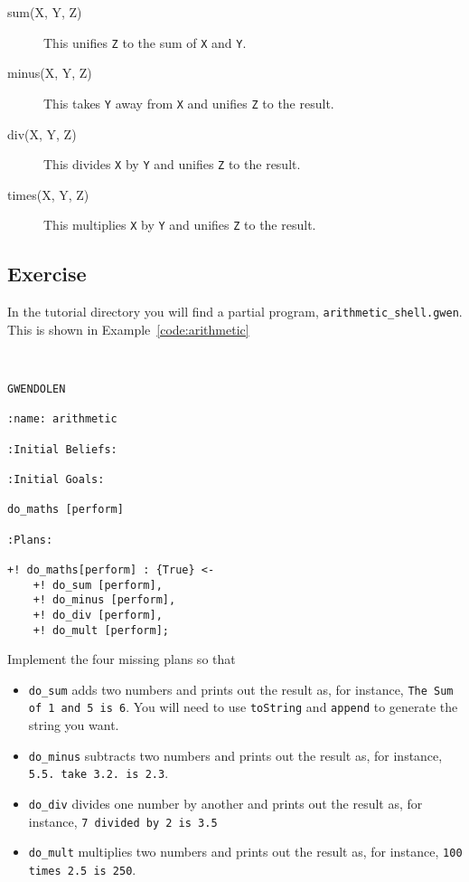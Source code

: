 \begin{description}
\item[sum(X, Y, Z)] This unifies \lstinline{Z} to the sum of \lstinline{X} and \lstinline{Y}.
\item[minus(X, Y, Z)] This takes \lstinline{Y} away from \lstinline{X} and unifies \lstinline{Z} to the result.
\item[div(X, Y, Z)] This divides \lstinline{X} by \lstinline{Y} and unifies \lstinline{Z} to the result.
\item[times(X, Y, Z)] This multiplies \lstinline{X} by \lstinline{Y} and unifies \lstinline{Z} to the result.
\end{description}

\subsection{Exercise}
\begin{sloppypar}
In the tutorial directory you will find a partial program, \texttt{arithmetic\_shell.gwen}.  This is shown in Example~\ref{code:arithmetic}
\end{sloppypar}

\begin{ourexample}
\label{code:arithmetic} \quad \\
\begin{lstlisting}[basicstyle=\sffamily,style=easslisting,language=Gwendolen]
GWENDOLEN

:name: arithmetic

:Initial Beliefs:

:Initial Goals:

do_maths [perform]

:Plans:
	
+! do_maths[perform] : {True} <-
	+! do_sum [perform],
	+! do_minus [perform],
	+! do_div [perform],
	+! do_mult [perform];
\end{lstlisting}
\end{ourexample}

Implement the four missing plans so that
\begin{itemize}
\item \lstinline{do_sum} adds two numbers and prints out the result as, for instance, \texttt{The Sum of 1 and 5 is 6}.  You will need to use \texttt{toString} and \texttt{append} to generate the string you want.
\item \lstinline{do_minus} subtracts two numbers and prints out the result as, for instance, \texttt{5.5. take 3.2. is 2.3}.
\item \lstinline{do_div} divides one number by another and prints out the result as, for instance, \texttt{7 divided by 2 is 3.5}
\item \lstinline{do_mult} multiplies two numbers and prints out the result as, for instance, \texttt{100 times 2.5 is 250}.
\end{itemize}

